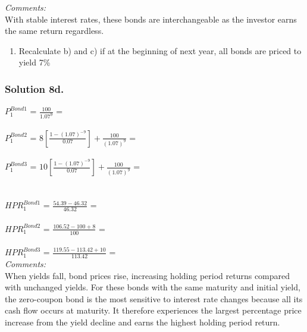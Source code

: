 \documentclass[12]{article}
\begin{document}
\noindent
\textit{Comments:} \\
With stable interest rates, these bonds are interchangeable as the investor earns the same return regardless.




\noindent
\color{black}
\begin{enumerate}
    \item[d)] Recalculate b) and c) if at the beginning of next year, all bonds are priced to yield 7\%
\end{enumerate}

\color{blue}
\subsubsection*{Solution 8d.}
$P_1^{Bond 1}$ = {\Large $\frac{100}{1.07^{9}}$} = \\
\\
$P_1^{Bond 2}$ = {\Large $8[\frac{1 - (1.07)^{-9}}{0.07}] + \frac{100}{(1.07)^{9}}$} =  \\
\\
$P_1^{Bond 3}$ = {\Large $10[\frac{1 - (1.07)^{-9}}{0.07}] + \frac{100}{(1.07)^{9}}$} =  \\
\\
\\
$HPR_1^{Bond 1}$ = {\Large $\frac{54.39 - 46.32 }{46.32}$ }= \\
\\
$HPR_1^{Bond 2}$ = {\Large $\frac{106.52 - 100 + 8 }{100}$ }= \\
\\
$HPR_1^{Bond 3}$ = {\Large $\frac{119.55 - 113.42 + 10 }{113.42}$ }= \\

\noindent
\textit{Comments:} \\
When yields fall, bond prices rise, increasing holding period returns compared with unchanged yields. For these bonds with the same maturity and initial yield, the zero-coupon bond is the most sensitive to interest rate changes because all its cash flow occurs at maturity. It therefore experiences the largest percentage price increase from the yield decline and earns the highest holding period return.
\end{document}
